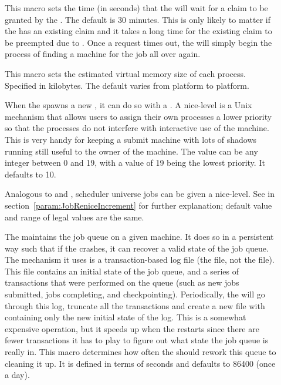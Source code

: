 \begin{description}
\item[]
  \label{param:RequestClaimTimeout} This macro sets the time (in
  seconds) that the  will wait for a claim to be granted by the
  .  The default is 30 minutes.  This is only likely to matter
  if the  has an existing claim and it takes a long time for the
  existing claim to be preempted due to .
  Once a request times out, the  will simply begin the process
  of finding a machine for the job all over again.

\item[] \label{param:ShadowSizeEstimate}
  This macro sets the estimated virtual memory size of each
   process.  Specified in kilobytes.  The default
  varies from platform to platform.

\item[]
  \label{param:ShadowReniceIncrement} When the  spawns a new
  , it can do so with a .  A
  nice-level is a
  Unix mechanism that allows users to assign their own processes a lower 
  priority so that the processes do not interfere with interactive use of the
  machine.  This is very handy for keeping a submit machine with lots
  of shadows running still useful to the owner of the machine.  The
  value can be any integer between 0 and 19, with a value of 19 being
  the lowest priority.  It defaults to 10.

\item[]
  \label{param:SchedUnivReniceIncrement} Analogous to 
   and
  , scheduler universe jobs can
  be given a nice-level.
  See   in
  section~\ref{param:JobReniceIncrement} for further explanation;
  default value and range of legal values are the same.

\item[] \label{param:QueueCleanInterval}
  The  maintains the job queue on a given machine.  It does so
  in a persistent way such that if the  crashes, it can recover
  a valid state of the job queue.  The mechanism it uses is a
  transaction-based log file (the  file,
  not the  file).  This file contains an initial
  state of the job queue, and a series of transactions that were
  performed on the queue (such as new jobs submitted, jobs completing,
  and checkpointing).  Periodically, the  will go through
  this log, truncate all the transactions and create a new file with
  containing only the new initial state of the log.
  This is a somewhat expensive operation,
  but it speeds up when the  restarts since there are
  fewer transactions it has to play to figure out what state the job
  queue is really in.  This macro determines how often the 
  should rework this queue to cleaning it up.  It is defined in terms of
  seconds and defaults to 86400 (once a day). 
  

\end{description}
